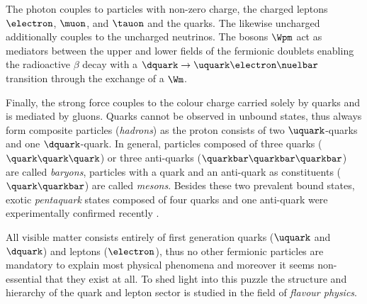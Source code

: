 The photon couples to particles with non-zero \EM charge, \ie the charged
leptons $\electron$, $\muon$, and $\tauon$ and the quarks. The likewise
uncharged \Zboson additionally couples to the uncharged neutrinos. The bosons
$\Wpm$ act as mediators between the upper and lower fields of the fermionic
doublets enabling \eg the radioactive $\beta$ decay with a
$\dquark\to\uquark\electron\nuelbar$ transition through the exchange of a $\Wm$.

Finally, the strong force couples to the colour charge carried solely by quarks
and is mediated by gluons. Quarks cannot be observed in unbound states, thus
always form composite particles (\emph{hadrons}) as \eg the proton consists of
two $\uquark$-quarks and one $\dquark$-quark. In general, particles composed of
three quarks ($\quark\quark\quark$) or three anti-quarks
($\quarkbar\quarkbar\quarkbar$) are called \emph{baryons}, particles with a
quark and an anti-quark as constituents ($\quark\quarkbar$) are called
\emph{mesons}. Besides these two prevalent bound states, exotic
\emph{pentaquark} states composed of four quarks and one anti-quark were
experimentally confirmed recently \cite{Aaij:2015tga}.

All visible matter consists entirely of first generation quarks ($\uquark$ and
$\dquark$) and leptons ($\electron$), thus no other fermionic particles are
mandatory to explain most physical phenomena and moreover it seems non-essential
that they exist at all. To shed light into this puzzle the structure and
hierarchy of the quark and lepton sector is studied in the field of
\emph{flavour physics}.
